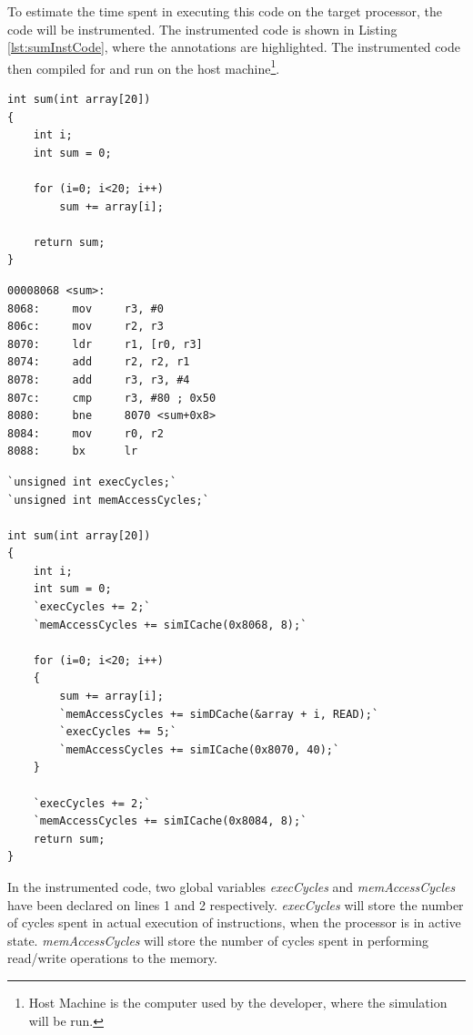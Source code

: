 To estimate the time spent in executing this code on the target processor, the code will be instrumented. The instrumented code is shown in Listing \ref{lst:sumInstCode}, where the annotations are highlighted. The instrumented code then compiled for and run on the host machine\footnote{Host Machine is the computer used by the developer, where the simulation will be run.}.

\vspace*{10pt}
\begin{minipage}{0.5\textwidth}
\begin{lstlisting}[caption={Simple C Code},label={lst:sumCCode}]
int sum(int array[20])
{
	int i;
	int sum = 0;
	
	for (i=0; i<20; i++)
		sum += array[i];
	
	return sum;
}
\end{lstlisting}
\end{minipage}%
\begin{minipage}{0.5\textwidth}
\begin{lstlisting}[caption={Objdump Code},label={lst:sumObjCode}]
00008068 <sum>:
8068:     mov     r3, #0
806c:     mov     r2, r3
8070:     ldr     r1, [r0, r3]
8074:     add     r2, r2, r1
8078:     add     r3, r3, #4
807c:     cmp     r3, #80 ; 0x50
8080:     bne     8070 <sum+0x8>
8084:     mov     r0, r2
8088:     bx      lr
\end{lstlisting}
\end{minipage}
\vspace*{5pt}
\begin{lstlisting}[caption={Instrumented Code},label={lst:sumInstCode}]
`unsigned int execCycles;`
`unsigned int memAccessCycles;`

int sum(int array[20])
{
	int i;
	int sum = 0;
	`execCycles += 2;`
	`memAccessCycles += simICache(0x8068, 8);`
	
	for (i=0; i<20; i++)
	{
		sum += array[i];
		`memAccessCycles += simDCache(&array + i, READ);`
		`execCycles += 5;`
		`memAccessCycles += simICache(0x8070, 40);`
	}
	
	`execCycles += 2;`
	`memAccessCycles += simICache(0x8084, 8);`
	return sum;
}
\end{lstlisting}

In the instrumented code, two global variables \emph{execCycles} and \emph{memAccessCycles} have been declared on lines 1 and 2 respectively. \emph{execCycles} will store the number of cycles spent in actual execution of instructions, when the processor is in active state. \emph{memAccessCycles} will store the number of cycles spent in performing read/write operations to the memory.

